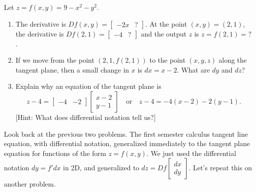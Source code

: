 \begin{problem}\label{tangent plane 9-x^2-y^2}%
%
%
 Let $z=f(x,y)=9-x^2-y^2$. 
\begin{enumerate}
 \item The derivative is $Df(x,y) = \begin{bmatrix}-2x&?\end{bmatrix}$. At the point $(x,y)=(2,1)$, the derivative is $Df(2,1) = \begin{bmatrix}-4&?\end{bmatrix}$ and the output $z$ is $z=f(2,1)=?$.
 \item If we move from the point $(2,1,f(2,1))$ to the point $(x,y,z)$ along the tangent plane, then a small change in $x$ is $dx=x-2$. What are $dy$ and $dz$?
 \item Explain why an equation of the tangent plane is 
$$
z-4=\begin{bmatrix}-4 & -2 \end{bmatrix}\begin{bmatrix}x-2\\y-1\end{bmatrix} 
\quad \text{or}\quad 
z-4=-4(x-2)-2(y-1).$$ [Hint: What does differential notation tell us?]
\end{enumerate}
\end{problem}

Look back at the previous two problems.  The first semester calculus tangent line equation, with differential notation, generalized immediately to the tangent plane equation for functions of the form $z=f(x,y)$.  We just used the differential notation $dy=f'dx$ in 2D, and generalized to $dz = Df \begin{bmatrix}dx\\dy\end{bmatrix}$. Let's repeat this on another problem.

